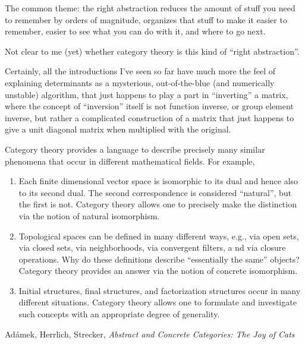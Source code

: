 \documentclass[11pt,openany]{book}
\begin{document}
The common theme: the right abstraction reduces 
the amount of stuff you need to remember by orders of magnitude,
organizes that stuff to make it easier to remember,
easier to see what you can do with it,
and where to go next.

Not clear to me (yet) whether category theory is this kind of
``right abstraction''. 

Certainly, all the introductions I've seen so far have much more
the feel of explaining determinants as a mysterious,
out-of-the-blue (and numerically unstable) algorithm,
that just happens to play a part in ``inverting'' a matrix,
where the concept of ``inversion'' itself is not 
function inverse, or group element inverse,
but rather a complicated construction of a matrix that
just happens to give a unit diagonal matrix when multiplied with 
the original.

\setcounter{currentlevel}{\value{baseSectionLevel}}
\label{sec:Why?}

\setlength{\epigraphwidth}{0.95\linewidth}

\begin{boxquote}
Category theory provides a language 
to describe precisely many similar phenomena that
occur in different mathematical fields. For example,
\begin{enumerate}
  \item  Each finite dimensional vector space is 
  isomorphic to its dual and hence also to its
second dual. The second correspondence is considered 
``natural'', but the first is
not. Category theory allows one to precisely 
make the distinction via the notion
of natural isomorphism.
\item Topological spaces can be defined in many different ways, 
e.g., via open sets, via
closed sets, via neighborhoods, via convergent filters, a
nd via closure operations.
Why do these definitions describe 
``essentially the same'' objects? Category theory
provides an answer via the notion of concrete isomorphism.
\item Initial structures, final structures, 
and factorization structures occur in many different
situations. Category theory allows one to formulate 
and investigate such
concepts with an appropriate degree of generality.
\end{enumerate}
\tcblower
{Ad\'{a}mek, Herrlich, Strecker, 
\emph{Abstract and Concrete Categories:
The Joy of Cats}~\cite{AdamekHerrlichStrecker:1990}}
\end{boxquote}
\end{document}
